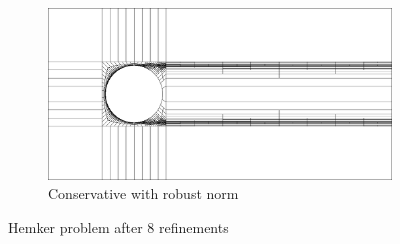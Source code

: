 \documentclass[letterpaper]{article}
\begin{document}
\begin{figure}
\begin{subfigure}[t]{0.45\textwidth}
\includegraphics[width=\textwidth]{figs/Hemker/robust8c_mesh.png}
\caption{Conservative with robust norm}
\label{fig:hemkerRobust8c}
\end{subfigure}
\caption{Hemker problem after 8 refinements}
\label{fig:hemker8}
\end{figure}
\end{document}
